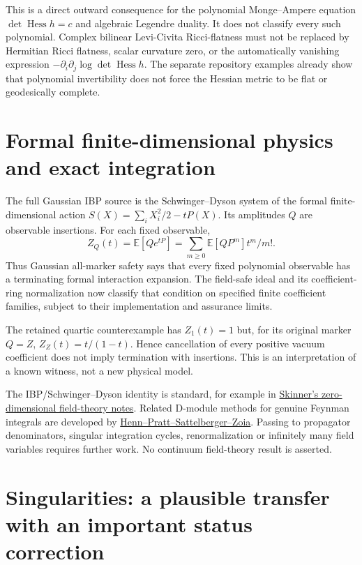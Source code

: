 \documentclass[11pt]{article}
\newcommand{\E}{\mathbb E}
\begin{document}
This is a direct outward consequence for the polynomial Monge--Ampere
equation $\det\operatorname{Hess}h=c$ and algebraic Legendre duality.
It does not classify every such polynomial. Complex bilinear
Levi-Civita Ricci-flatness must not be replaced by Hermitian Ricci
flatness, scalar curvature zero, or the automatically vanishing
expression $-\partial_i\partial_j\log\det\operatorname{Hess}h$.
The separate repository examples already show that polynomial invertibility
does not force the Hessian metric to be flat or geodesically complete.

\section{Formal finite-dimensional physics and exact integration}

The full Gaussian IBP source is the Schwinger--Dyson system of the
formal finite-dimensional action
$S(X)=\sum_iX_i^2/2-tP(X)$. Its amplitudes $Q$ are observable insertions.
For each fixed observable,
\[
       Z_Q(t)=\E[Qe^{tP}]
             =\sum_{m\ge0}\E[QP^m]t^m/m!.
\]
Thus Gaussian all-marker safety says that every fixed polynomial
observable has a terminating formal interaction expansion. The field-safe
ideal and its coefficient-ring normalization now classify that condition
on specified finite coefficient families, subject to their implementation
and assurance limits.

The retained quartic counterexample has $Z_1(t)=1$ but, for its original
marker $Q=Z$, $Z_Z(t)=t/(1-t)$. Hence cancellation of every positive
vacuum coefficient does not imply termination with insertions.
This is an interpretation of a known witness, not a new physical model.

The IBP/Schwinger--Dyson identity is standard, for example in
\href{https://www.damtp.cam.ac.uk/user/dbs26/AQFT/chaps1\%2B2.pdf}{Skinner's
zero-dimensional field-theory notes}. Related D-module methods for genuine
Feynman integrals are developed by
\href{https://doi.org/10.1007/s11005-024-01835-7}{Henn--Pratt--Sattelberger--Zoia}.
Passing to propagator denominators, singular integration cycles,
renormalization or infinitely many field variables requires further work.
No continuum field-theory result is asserted.

\section{Singularities: a plausible transfer with an important status correction}
\end{document}
